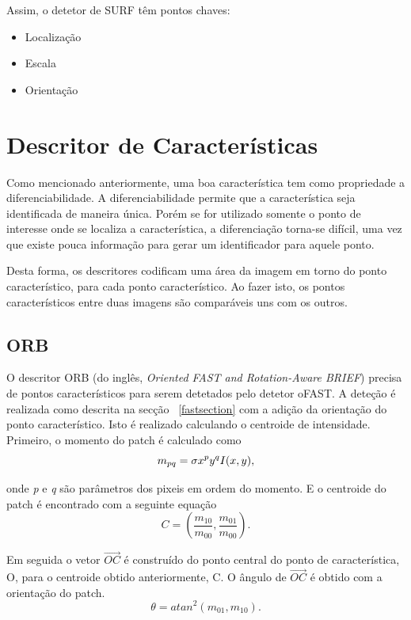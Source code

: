 Assim, o detetor de SURF têm pontos chaves:
\begin{itemize}
	\item Localização
	\item Escala
	\item Orientação
\end{itemize}


\section{Descritor de Características}

Como mencionado anteriormente, uma boa característica tem como propriedade a diferenciabilidade. A diferenciabilidade permite que a característica seja identificada de maneira única. Porém se for utilizado somente o ponto de interesse onde se localiza a característica, a diferenciação torna-se difícil, uma vez que existe pouca informação para gerar um identificador para aquele ponto.

Desta forma, os descritores codificam uma área da imagem em torno do ponto característico, para cada ponto característico. Ao fazer isto, os pontos característicos entre duas imagens são comparáveis uns com os outros.


\subsection{ORB}

O descritor ORB (do inglês, \textit{Oriented FAST and Rotation-Aware BRIEF}) precisa de pontos característicos para serem detetados pelo detetor oFAST. A deteção é realizada como descrita na secção ~\ref{fastsection} com a adição da orientação do ponto característico. Isto é realizado calculando o centroide de intensidade. Primeiro, o momento do patch é calculado como 
\begin{equation}\label{equacao2.5.1.1}
 \textit{$m_{pq}$} = \sigma \textit{$ x^py^qI$}(x,y),
\end{equation}

onde \textit{p} e \textit{q} são parâmetros dos pixeis em ordem do momento. E o centroide do patch é encontrado com a seguinte equação 
\begin{equation}\label{equacao2.5.1.2}
 C = ( \frac{ \textit{m}_{10} }{ \textit{m}_{00}},  \frac{ \textit{m}_{01} }{ \textit{m}_{00}} ) . 
\end{equation}

Em seguida o vetor $\vec{OC}$ é construído do ponto central do ponto de característica, O, para o centroide obtido anteriormente, C. O ângulo de $\vec{OC}$ é obtido com a orientação do patch. 
\begin{equation}\label{equacao2.5.1.3}
	\theta = atan^2( \textit{m}_{01},\textit{m}_{10}) .
\end{equation} 

